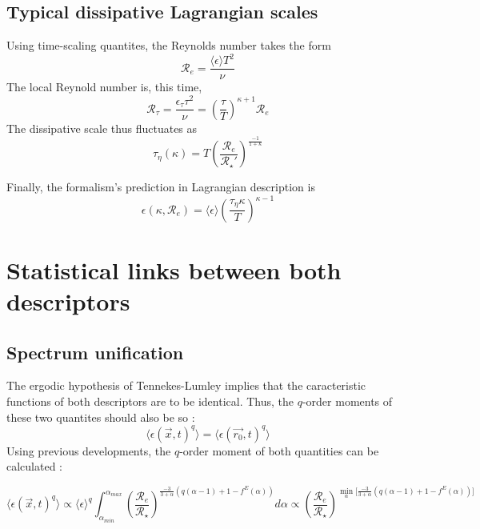 \subsection{Typical dissipative Lagrangian scales}

Using time-scaling quantites, the Reynolds number takes the form
\begin{equation}
    \mathcal{R}_e=\frac{\langle\epsilon\rangle T^2}{\nu}
\end{equation}
The local Reynold number is, this time,
\begin{equation}
    \mathcal{R}_\tau=\frac{\epsilon_\tau\tau^2}{\nu}=\left(\frac{\tau}{T}\right)^{\kappa+1}\mathcal{R}_e
\end{equation}
The dissipative scale thus fluctuates as
\begin{equation}
    \tau_\eta(\kappa)=T\left(\frac{\mathcal{R}_e}{\mathcal{R}_\star'}\right)^{\frac{-1}{1+\kappa}}
\end{equation}

Finally, the formalism's prediction in Lagrangian description is
\begin{equation}
    \epsilon(\kappa,\mathcal{R}_e)=\langle\epsilon\rangle\left(\frac{\tau_\eta{\kappa}}{T}\right)^{\kappa-1}
\end{equation}

\section{Statistical links between both descriptors}
\subsection{Spectrum unification}
The ergodic hypothesis of Tennekes-Lumley implies that the caracteristic functions of both descriptors are to be identical.
Thus, the $q$-order moments of these two quantites should also be so :
\begin{equation}
    \langle\epsilon(\vec{x},t)^q\rangle=\langle\epsilon(\vec{r_0},t)^q\rangle
\end{equation}
Using previous developments, the $q$-order moment of both quantities can be calculated :\\

\begin{fullwidth}\begin{equation}
    \displaystyle \langle\epsilon(\vec{x},t)^q\rangle\propto\langle\epsilon\rangle^q\int_{\alpha_{min}}^{\alpha_{max}}\left(\frac{\mathcal{R}_e}{\mathcal{R}_\star}\right)^{\frac{-3}{3+\alpha}\left(q(\alpha-1)+1-f^E(\alpha)\right)}d\alpha\propto\left(\frac{\mathcal{R}_e}{\mathcal{R}_\star}\right)^{\min_\alpha\bigg[\frac{-3}{3+\alpha}\left(q(\alpha-1)+1-f^E(\alpha)\right)\bigg]}
\end{equation}\end{fullwidth}

